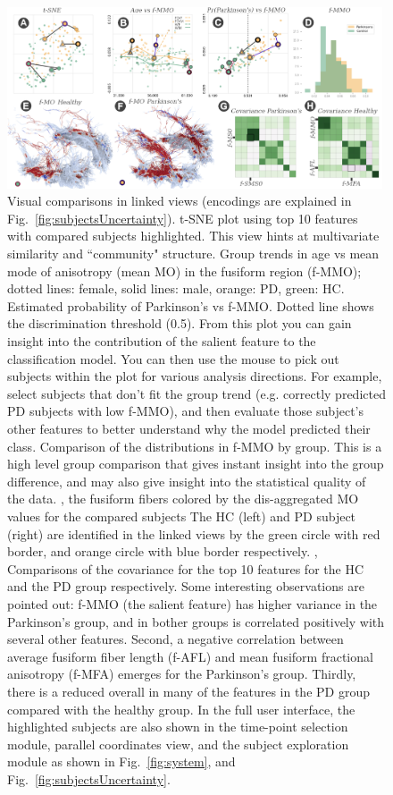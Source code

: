 \begin{figure}[t]
\centering
\includegraphics[width=0.99\textwidth]{images/comparisonV3labeled.png}
\caption{Visual comparisons in linked views (encodings are explained in Fig.~\ref{fig:subjectsUncertainty}).  t-SNE plot using top 10 features with compared subjects highlighted. This view hints at multivariate similarity and ``community" structure.
 Group trends in age vs mean mode of anisotropy (mean MO) in the fusiform region (f-MMO); dotted lines: female, solid lines: male, orange: PD, green: HC.  Estimated probability of Parkinson's vs f-MMO. Dotted line shows the discrimination threshold (0.5). From this plot you can gain insight into the contribution of the salient feature to the classification model. You can then use the mouse to pick out subjects within the plot for various analysis directions. For example, select subjects that don't fit the group trend (e.g. correctly predicted PD subjects with low f-MMO), and then evaluate those subject's other features to better understand why the model predicted their class.  Comparison of the distributions in f-MMO by group. This is a high level group comparison that gives instant insight into the group difference, and may also give insight into the statistical quality of the data. , the fusiform fibers colored by the dis-aggregated MO values for the compared subjects The HC (left) and PD subject (right) are identified in the linked views by the green circle with red border, and orange circle with blue border respectively. , Comparisons of the covariance for the top 10 features for the HC and the PD group respectively. Some interesting observations are pointed out: f-MMO (the salient feature) has higher variance in the Parkinson's group, and in bother groups is correlated positively with several other features. Second, a negative correlation between average fusiform fiber length (f-AFL) and mean fusiform fractional anisotropy (f-MFA) emerges for the Parkinson's group. Thirdly, there is a reduced overall in many of the features in the PD group compared with the healthy group. In the full user interface, the highlighted subjects are also shown in the time-point selection module, parallel coordinates view, and the subject exploration module as shown in Fig.~\ref{fig:system}, and Fig.~\ref{fig:subjectsUncertainty}.}
\label{fig:infovis}
\end{figure}

